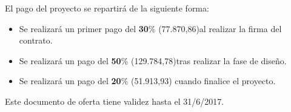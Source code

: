 \par El pago del proyecto se repartirá de la siguiente forma:
\begin{itemize}[-]
\item Se realizará un primer pago del \textbf{30}\% (77.870,86)al realizar la firma del contrato.
\item Se realizará un pago del \textbf{50}\% (129.784,78)tras realizar la fase de diseño.
\item Se realizará un pago del \textbf{20}\% (51.913,93) cuando finalice el proyecto.
\end{itemize}

\par Este documento de oferta tiene validez hasta el 31/6/2017.
